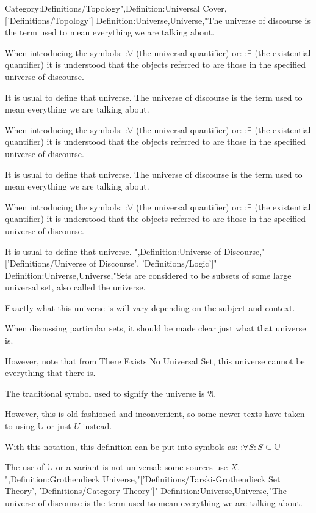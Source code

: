 Category:Definitions/Topology",Definition:Universal Cover,['Definitions/Topology']
Definition:Universe,Universe,"The universe of discourse is the term used to mean everything we are talking about.


When introducing the symbols:
:$\forall$ (the universal quantifier)
or:
:$\exists$ (the existential quantifier)
it is understood that the objects referred to are those in the specified universe of discourse.

It is usual to define that universe.
The universe of discourse is the term used to mean everything we are talking about.


When introducing the symbols:
:$\forall$ (the universal quantifier)
or:
:$\exists$ (the existential quantifier)
it is understood that the objects referred to are those in the specified universe of discourse.

It is usual to define that universe.
The universe of discourse is the term used to mean everything we are talking about.


When introducing the symbols:
:$\forall$ (the universal quantifier)
or:
:$\exists$ (the existential quantifier)
it is understood that the objects referred to are those in the specified universe of discourse.

It is usual to define that universe.
",Definition:Universe of Discourse,"['Definitions/Universe of Discourse', 'Definitions/Logic']"
Definition:Universe,Universe,"Sets are considered to be subsets of some large universal set, also called the universe.

Exactly what this universe is will vary depending on the subject and context.

When discussing particular sets, it should be made clear just what that universe is.

However, note that from There Exists No Universal Set, this universe cannot be everything that there is.


The traditional symbol used to signify the universe is $\mathfrak A$.

However, this is old-fashioned and inconvenient, so some newer texts have taken to using $\mathbb U$ or just $U$ instead.


With this notation, this definition can be put into symbols as:
:$\forall S: S \subseteq \mathbb U$


The use of $\mathbb U$ or a variant is not universal: some sources use $X$.
",Definition:Grothendieck Universe,"['Definitions/Tarski-Grothendieck Set Theory', 'Definitions/Category Theory']"
Definition:Universe,Universe,"The universe of discourse is the term used to mean everything we are talking about.


